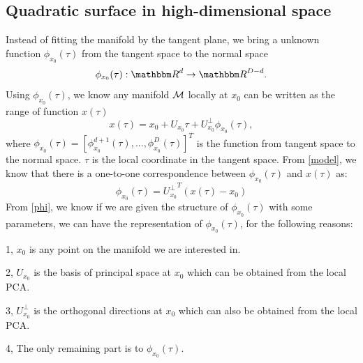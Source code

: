 \documentclass{article}
\theoremstyle{remark}
\begin{document}
\subsection{Quadratic surface in high-dimensional space }

 Instead of fitting the manifold by the tangent plane, we bring a unknown function $\phi_{x_0}(\tau)$ from the tangent space to the normal space
 \[
 \phi_{x_0}(\tau): {\mathbbm R}^d \rightarrow {\mathbbm R}^{D-d}.
 \] 
 Using  $\phi_{x_0}(\tau)$, we know any manifold $\cal M$ locally at $x_0$ can be written as the range of  function   $x(\tau)$
  \begin{equation}\label{model}
  x (\tau)=  x_0 + U_{x_0} \tau+ U_{x_0}^{\perp} \phi_{x_0} (\tau),
  \end{equation}
where $\phi_{x_0}(\tau)=[\phi_{x_0}^{d+1}(\tau),...,\phi_{x_0}^{D}(\tau)]^T$  is the function from tangent space to the normal space. $\tau$ is the local coordinate in the tangent space.
From \eqref{model}, we know that there is a one-to-one correspondence between $\phi_{x_0} (\tau)$ and $x(\tau)$ as: %
\begin{equation}\label{phi}
\phi_{x_0}(\tau) = {U_{x_0}^{\perp}}^{T}(x(\tau)-x_0)
\end{equation}
From \eqref{phi}, we know if we are given the structure of $\phi_{x_0}(\tau)$ with some parameters, we can have the representation of $\phi_{x_0}(\tau)$, for the following reasons:

1, $x_0$ is any point on the manifold we are interested in.

2,  $U_{x_0}$ is the basis of principal space at $x_0$ which can be obtained from the local PCA. 

3, $U_{x_0}^{\perp}$ is the orthogonal directions at $x_0$ which can also be obtained from the local PCA.

4, The only remaining part is to  $\phi_{x_0} (\tau)$.
\end{document}
